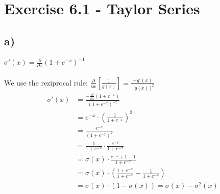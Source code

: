 \documentclass[a4paper]{article}
\begin{document}



\section*{Exercise 6.1 - Taylor Series}
    \subsection*{a)}
        $\sigma'(x) = \frac{\partial}{\partial x} (1 + e^{-x})^{-1}$\\\\
        We use the reziprocal rule:
        $\frac{\partial}{\partial x} \left[\frac{1}{g(x)}\right] = \frac{-g'(x)}{[g(x)]^2}$
        \begin{align*}
            \sigma'(x) &= \frac{- \frac{\partial}{\partial x} (1 + e^{-x})}{(1 + e^{-x})^{-2}}\\
            &= e^{-x} \cdot \left( \frac{1}{1+e^{-x}} \right)^2\\
            &= \frac{e^{-x}}{(1+e^{-x})^2}\\
            &= \frac{1}{1+e^{-x}} \cdot \frac{e^{-x}}{1+e^{-x}}\\
            &= \sigma(x) \cdot \frac{e^{-x} + 1 - 1}{1+e^{-x}}\\
            &= \sigma(x) \cdot \left(\frac{1 + e^{-x}}{1+e^{-x}} - \frac{1}{1+e^{-x}}\right)\\
            &= \sigma(x) \cdot (1 - \sigma(x)) = \sigma(x) - \sigma^2(x)
        \end{align*}
\end{document}
